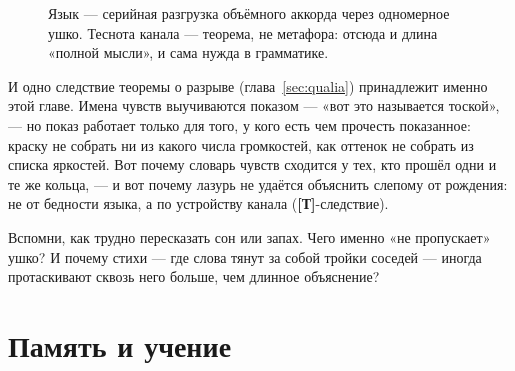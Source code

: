 \documentclass[11pt,letterpaper]{article}
\newcommand{\stT}{\textbf{[Т]}\xspace}
\begin{document}
\begin{figure}[H]
\centering
{}
\caption{Язык --- серийная разгрузка объёмного аккорда через
одномерное ушко. Теснота канала --- теорема, не метафора: отсюда и
длина «полной мысли», и сама нужда в грамматике.}
\label{fig:needle}
\end{figure}

И одно следствие теоремы о разрыве (глава~\ref{sec:qualia})
принадлежит именно этой главе. Имена чувств выучиваются показом ---
«вот это называется тоской», --- но показ работает только для того,
у кого есть чем прочесть показанное: краску не собрать ни из какого
числа громкостей, как оттенок не собрать из списка яркостей.
Вот почему словарь чувств сходится у тех, кто прошёл одни и те же
кольца, --- и вот почему лазурь не удаётся объяснить слепому от
рождения: не от бедности языка, а по устройству канала
(\stT-следствие).

\begin{askbox}
Вспомни, как трудно пересказать сон или запах. Чего именно «не
пропускает» ушко? И почему стихи --- где слова тянут за собой тройки
соседей --- иногда протаскивают сквозь него больше, чем длинное
объяснение?
\end{askbox}

\section{Память и учение}
\label{sec:memory}
\end{document}
